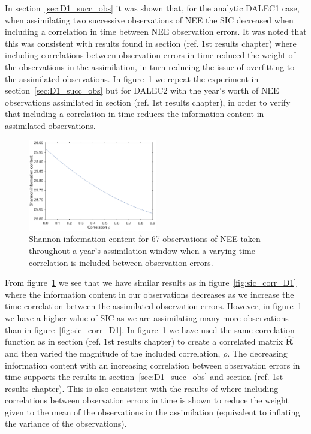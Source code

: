 \documentclass[11pt]{article}
\begin{document}
In section~\ref{sec:D1_succ_obs} it was shown that, for the analytic DALEC1 case, when assimilating two successive observations of NEE the SIC decreased when including a correlation in time between NEE observation errors. It was noted that this was consistent with results found in section ({\color{red}ref. 1st results chapter}) where including correlations between observation errors in time reduced the weight of the observations in the assimilation, in turn reducing the issue of overfitting to the assimilated observations. In figure~\ref{fig:sic_corr_D2} we repeat the experiment in section~\ref{sec:D1_succ_obs} but for DALEC2 with the year's worth of NEE observations assimilated in section ({\color{red}ref. 1st results chapter}), in order to verify that including a correlation in time reduces the information content in assimilated observations. 
\begin{figure}[ht]
	\centering
        \includegraphics[width=0.5\textwidth]{sic_corr_D2_nee.pdf}
    \caption{Shannon information content for 67 observations of NEE taken throughout a year's assimilation window when a varying time correlation is included between observation errors.}
    \label{fig:sic_corr_D2}
\end{figure}
From figure~\ref{fig:sic_corr_D2} we see that we have similar results as in figure~\ref{fig:sic_corr_D1} where the information content in our observations decreases as we increase the time correlation between the assimilated observation errors. However, in figure~\ref{fig:sic_corr_D2} we have a higher value of SIC as we are assimilating many more observations than in figure~\ref{fig:sic_corr_D1}. In figure~\ref{fig:sic_corr_D2} we have used the same correlation function as in section ({\color{red}ref. 1st results chapter}) to create a correlated matrix \(\hat{\textbf{R}}\) and then varied the magnitude of the included correlation, \(\rho\). The decreasing information content with an increasing correlation between observation errors in time supports the results in section~\ref{sec:D1_succ_obs} and section ({\color{red}ref. 1st results chapter}). This is also consistent with the results of  \citet{jarvinen1999variational} where including correlations between observation errors in time is shown to reduce the weight given to the mean of the observations in the assimilation (equivalent to inflating the variance of the observations).
\end{document}
